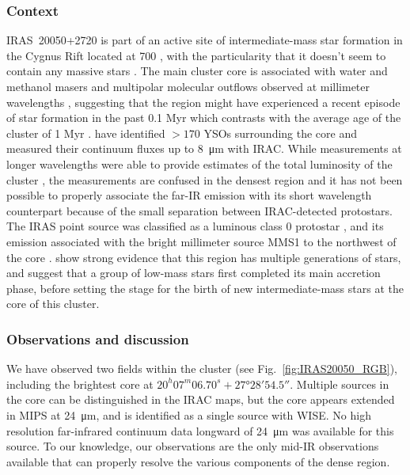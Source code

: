 \subsubsection{Context}
IRAS~20050+2720 is part of an active site of intermediate-mass star formation in the Cygnus Rift located at \SI{700}{\pc} \citep{Wilking:1989el}, with the particularity that it doesn't seem to contain any massive stars \citep{Gunther:2012dq}. The main cluster core is associated with water and methanol masers \citep{Palla:1991up,Fontani:2010cf} and multipolar molecular outflows observed at millimeter wavelengths \citep{Bachiller:1995cy,Anglada:1998uu,Beltran:2008gu}, suggesting that the region might have experienced a recent episode of star formation in the past 0.1 Myr which contrasts with the average age of the cluster of 1 Myr \citep{Chen:1997tb,Gutermuth:2005hx}. \cite{Gutermuth:2009gca} have identified $>170$ YSOs surrounding the core and measured their continuum fluxes up to \SI{8}{\micro\meter} with IRAC. While measurements at longer wavelengths were able to provide estimates of the total luminosity of the cluster \citep[e.g. using IRAS,][\SI{388}{\Lsun}]{Molinari:1996td}, the measurements are confused in the densest region and it has not been possible to properly associate the far-IR emission with its short wavelength counterpart because of the small separation between IRAC-detected protostars. The IRAS point source was classified as a luminous class 0 protostar \citep{Bachiller:1996ja}, and its emission associated with the bright millimeter source MMS1 to the northwest of the core \citep{Chini:2001fa}. \citet{Beltran:2008gu} show strong evidence that this region has multiple generations of stars, and suggest that a group of low-mass stars first completed its main accretion phase, before setting the stage for the birth of new intermediate-mass stars at the core of this cluster.


\subsubsection{Observations and discussion}


We have observed two fields within the cluster (see Fig.~\ref{fig:IRAS20050_RGB}), including the brightest core at $20^h 07^m 06.70^s +\ang{27;28;54.5}$. Multiple sources in the core can be distinguished in the IRAC maps, but the core appears extended in \Spitzer MIPS at \SI{24}{\micro\meter}, and is identified as a single source with WISE. No high resolution far-infrared continuum data longward of \SI{24}{\micro\meter} was available for this source. To our knowledge, our observations are the only mid-IR observations available that can properly resolve the various components of the dense region. 


